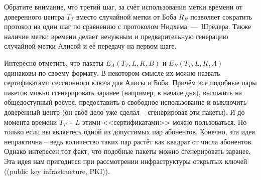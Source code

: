 Обратите внимание, что третий шаг, за счёт использования метки времени от доверенного центра $T_T$ вместо случайной метки от Боба $R_B$ позволяет сократить протокол на один шаг по сравнению с протоколом Нидхема~---~Шрёдера. Также наличие метки времени делает ненужным и предварительную генерацию случайной метки Алисой и её передачу на первом шаге.

Интересно отметить, что пакеты $E_A \left( T_T, L, K, B \right)$ и $E_B \left( T_T, L, K, A \right)$ одинаковы по своему формату. В некотором смысле их можно назвать сертификатами сессионного ключа для Алисы и Боба. Причём все подобные пары пакетов можно сгенерировать заранее (например, в начале дня), выложить на общедоступный ресурс, предоставить в свободное использование и выключить доверенный центр (он своё дело уже сделал -- сгенерировав эти пакеты). И до момента времени $T_T + L$ этими <<сертификатами>> можно пользоваться. Но только если вы являетесь одной из допустимых пар абонентов. Конечно, эта идея непрактична -- ведь количество таких пар растёт как квадрат от числа абонентов. Однако интересен тот факт, что подобные пакеты можно сгенерировать заранее. Эта идея нам пригодится при рассмотрении инфраструктуры открытых ключей (\langen(public key infrastructure, PKI)).

